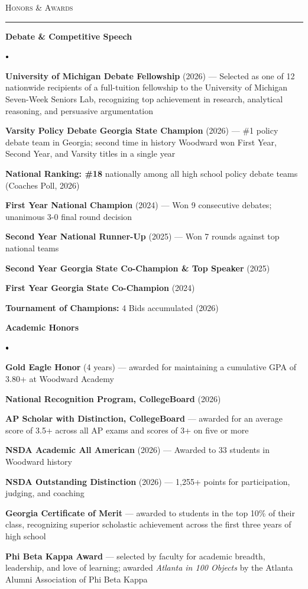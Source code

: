 \documentclass[letterpaper,11pt]{article}
\renewcommand{\section}[1]{%
  \vspace{6pt}%
  {\large\scshape #1}\par
  \vspace{-4pt}%
  \rule{\textwidth}{0.8pt}%
  \vspace{-6pt}\par
}
\newcommand{\resumeItem}[1]{
  \item\small{
    {#1}
  }
}
\newcommand{\resumeSubHeadingListStart}{%
  \begin{list}{}{%
    \setlength{\leftmargin}{0.15in}%
    \setlength{\labelwidth}{0pt}%
    \setlength{\labelsep}{0pt}%
    \setlength{\itemsep}{0pt}%
    \setlength{\parsep}{0pt}%
    \setlength{\topsep}{3pt}%
    \renewcommand{\makelabel}[1]{}}}
\newcommand{\resumeSubHeadingListEnd}{\end{list}}
\newcommand{\resumeItemListStart}{%
  \begin{list}{$\vcenter{\hbox{\scriptsize$\bullet$}}$}{%
    \setlength{\leftmargin}{0.3in}%
    \setlength{\labelwidth}{0.15in}%
    \setlength{\labelsep}{0.1in}%
    \setlength{\itemsep}{2pt}%
    \setlength{\parsep}{0pt}%
    \setlength{\topsep}{3pt}%
    \setlength{\itemindent}{0pt}}}
\newcommand{\resumeItemListEnd}{\end{list}\vspace{1pt}}
\begin{document}
\section{Honors \& Awards}
  \resumeSubHeadingListStart
    \item \textbf{Debate \& Competitive Speech}
    \resumeItemListStart
      \resumeItem{\textbf{University of Michigan Debate Fellowship} (2026) --- Selected as one of 12 nationwide recipients of a full-tuition fellowship to the University of Michigan Seven-Week Seniors Lab, recognizing top achievement in research, analytical reasoning, and persuasive argumentation}
      \resumeItem{\textbf{Varsity Policy Debate Georgia State Champion} (2026) --- \#1 policy debate team in Georgia; second time in history Woodward won First Year, Second Year, and Varsity titles in a single year}
      \resumeItem{\textbf{National Ranking: \#18} nationally among all high school policy debate teams (Coaches Poll, 2026)}
      \resumeItem{\textbf{First Year National Champion} (2024) --- Won 9 consecutive debates; unanimous 3-0 final round decision}
      \resumeItem{\textbf{Second Year National Runner-Up} (2025) --- Won 7 rounds against top national teams}
      \resumeItem{\textbf{Second Year Georgia State Co-Champion \& Top Speaker} (2025)}
      \resumeItem{\textbf{First Year Georgia State Co-Champion} (2024)}
      \resumeItem{\textbf{Tournament of Champions:} 4 Bids accumulated (2026)}
    \resumeItemListEnd
    \item \textbf{Academic Honors}
    \resumeItemListStart
      \resumeItem{\textbf{Gold Eagle Honor} (4 years) --- awarded for maintaining a cumulative GPA of 3.80+ at Woodward Academy}
      \resumeItem{\textbf{National Recognition Program, CollegeBoard} (2026)}
      \resumeItem{\textbf{AP Scholar with Distinction, CollegeBoard} --- awarded for an average score of 3.5+ across all AP exams and scores of 3+ on five or more}
      \resumeItem{\textbf{NSDA Academic All American} (2026) --- Awarded to 33 students in Woodward history}
      \resumeItem{\textbf{NSDA Outstanding Distinction} (2026) --- 1,255+ points for participation, judging, and coaching}
      \resumeItem{\textbf{Georgia Certificate of Merit} --- awarded to students in the top 10\% of their class, recognizing superior scholastic achievement across the first three years of high school}
      \resumeItem{\textbf{Phi Beta Kappa Award} --- selected by faculty for academic breadth, leadership, and love of learning; awarded \emph{Atlanta in 100 Objects} by the Atlanta Alumni Association of Phi Beta Kappa}
    \resumeItemListEnd
  \resumeSubHeadingListEnd
\end{document}
